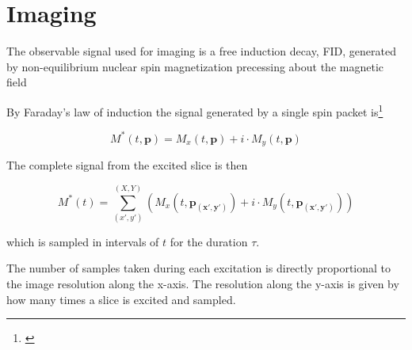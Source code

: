 \section{Imaging}
\label{sec:imaging}


The observable signal used for imaging is a free induction decay, FID,
generated by non-equilibrium nuclear spin magnetization precessing
about the magnetic field





By Faraday's law of induction the signal generated by a single spin
packet is\footnote{\cite{feeman}}

\begin{displaymath}
  M^*(t, \mathbf{p}) = M_x(t, \mathbf{p}) + i \cdot M_y(t, \mathbf{p})
\end{displaymath}

The complete signal from the excited slice is then

\begin{displaymath}
    M^*(t) = \sum^{(X, Y)}_{(x',y')} (M_x(t, \mathbf{p_{(x',y')}}) + i \cdot M_y(t, \mathbf{p_{(x',y')}}))
\end{displaymath}

which is sampled in intervals of $t$ for the duration $\tau$.


The number of samples taken during each excitation is directly
proportional to the image resolution along the x-axis. The resolution
along the y-axis is given by how many times a slice is excited and
sampled.


